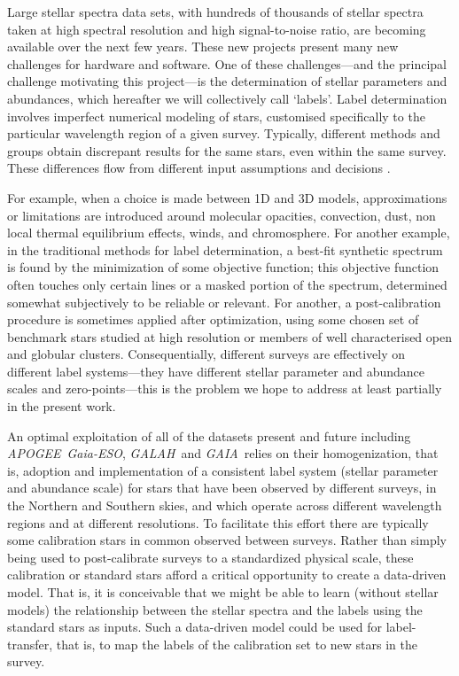 \documentclass[12pt, preprint]{aastex}
\newcommand{\apogee}{\textsl{APOGEE}}
\newcommand{\galah}{\textsl{GALAH}}
\newcommand{\gaiaeso}{\textsl{Gaia-ESO}}
\newcommand{\gaia}{\textsl{GAIA}}
\begin{document}
Large stellar spectra data sets, with hundreds of thousands of stellar
spectra taken at high spectral resolution and high signal-to-noise
ratio, are becoming available over the next few years.
These new projects present many new challenges for hardware and
software.
One of these challenges---and the principal challenge motivating this
project---is the determination of stellar parameters and abundances,
which hereafter we will collectively call `labels'.
Label determination involves imperfect numerical modeling of stars,
customised specifically to the particular wavelength region of a given
survey.
Typically, different methods and groups obtain discrepant results for
the same stars, even within the same survey.  These differences flow
from different input assumptions and decisions \citep[e.g.]{Sm2014}.

For example, when a choice is made between 1D and 3D models,
approximations or limitations are introduced around molecular
opacities, convection, dust, non local thermal equilibrium
effects, winds, and chromosphere.
For another example, in the traditional methods for label
determination, a best-fit synthetic spectrum is found by the
minimization of some objective function; this objective function often
touches only certain lines or a masked portion of the spectrum,
determined somewhat subjectively to be reliable or relevant.
For another, a post-calibration procedure is sometimes applied after
optimization, using some chosen set of benchmark stars studied at high
resolution or members of well characterised open and globular
clusters.
Consequentially, different surveys are effectively on different label
systems---they have different stellar parameter and abundance scales
and zero-points---this is the problem we hope to address at least
partially in the present work.

An optimal exploitation of all of the datasets present and future
including \apogee\, \gaiaeso, \galah\ and \gaia\ relies on their
homogenization, that is, adoption and implementation of a consistent
label system (stellar parameter and abundance scale) for stars that
have been observed by different surveys, in the Northern and Southern
skies, and which operate across different wavelength regions and at
different resolutions.
To facilitate this effort there are typically some calibration stars
in common observed between surveys.
Rather than simply being used to post-calibrate surveys to a
standardized physical scale, these calibration or standard stars
afford a critical opportunity to create a data-driven model.
That is, it is conceivable that we might be able to learn (without
stellar models) the relationship between the stellar spectra and the
labels using the standard stars as inputs.
Such a data-driven model could be used for label-transfer, that is, to
map the labels of the calibration set to new stars in the survey.
\end{document}
